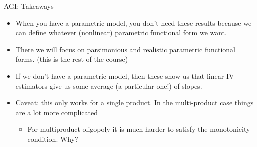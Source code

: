 \documentclass[xcolor=pdftex,dvipsnames,table,mathserif,aspectratio=169]{beamer}
\begin{document}
\begin{frame}{AGI: Takeaways}
\begin{itemize}
\item When you have a parametric model, you don't need these results because we can define whatever (nonlinear) parametric functional form we want.
\item There we will focus on parsimonious and realistic parametric functional forms. (this is the rest of the course)
\item If we don't have a parametric model, then these show us that linear IV estimators give us some average (a particular one!) of slopes.
\item Caveat: this only works for a single product. In the multi-product case things are a lot more complicated
\begin{itemize}
\item For multiproduct oligopoly it is much harder to satisfy the \alert{monotonicity} condition.  Why?
\end{itemize}
\end{itemize}
\end{frame}
\end{document}

